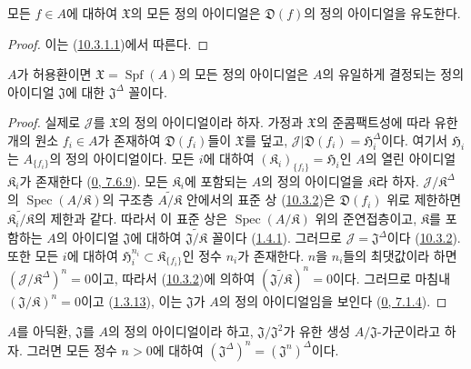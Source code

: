\begin{proposition}[10.3.4]
\label{I.10.3.4-ko}
모든 $f\in A$에 대하여 $\mathfrak{X}$의 모든 정의 아이디얼은
$\mathfrak{D}(f)$의 정의 아이디얼을 유도한다.
\end{proposition}

\begin{proof}
이는 (\hyperref[I.10.3.1.1-ko]{10.3.1.1})에서 따른다.
\end{proof}

\begin{proposition}[10.3.5]
\label{I.10.3.5-ko}
$A$가 허용환이면 $\mathfrak{X}=\operatorname{Spf}(A)$의 모든 정의
아이디얼은 $A$의 유일하게 결정되는 정의 아이디얼 $\mathfrak{J}$에 대한
$\mathfrak{J}^\Delta$ 꼴이다.
\end{proposition}

\begin{proof}
실제로 $\mathscr{J}$를 $\mathfrak{X}$의 정의 아이디얼이라 하자.
가정과 $\mathfrak{X}$의 준콤팩트성에 따라 유한 개의 원소
$f_i\in A$가 존재하여 $\mathfrak{D}(f_i)$들이 $\mathfrak{X}$를 덮고,
$\mathscr{J}|\mathfrak{D}(f_i)=\mathfrak{H}_i^\Delta$이다. 여기서
$\mathfrak{H}_i$는 $A_{\{f_i\}}$의 정의 아이디얼이다. 모든 $i$에
대하여 $(\mathfrak{K}_i)_{\{f_i\}}=\mathfrak{H}_i$인 $A$의 열린
아이디얼 $\mathfrak{K}_i$가 존재한다
(\hyperref[0.7.6.9-ko]{0, 7.6.9}). 모든 $\mathfrak{K}_i$에 포함되는
$A$의 정의 아이디얼을 $\mathfrak{K}$라 하자.
$\mathscr{J}/\mathfrak{K}^\Delta$의
$\operatorname{Spec}(A/\mathfrak{K})$의 구조층
$\widetilde{A/\mathfrak{K}}$ 안에서의 표준 상
(\hyperref[I.10.3.2-ko]{10.3.2})은 $\mathfrak{D}(f_i)$ 위로 제한하면
$\widetilde{\mathfrak{K}_i/\mathfrak{K}}$의 제한과 같다. 따라서 이
표준 상은 $\operatorname{Spec}(A/\mathfrak{K})$ 위의 준연접층이고,
$\mathfrak{K}$를 포함하는 $A$의 아이디얼 $\mathfrak{J}$에 대하여
$\widetilde{\mathfrak{J}/\mathfrak{K}}$ 꼴이다
(\hyperref[I.1.4.1-ko]{1.4.1}). 그러므로
$\mathscr{J}=\mathfrak{J}^\Delta$이다
(\hyperref[I.10.3.2-ko]{10.3.2}). 또한 모든 $i$에 대하여
$\mathfrak{H}_i^{n_i}\subset\mathfrak{K}_{\{f_i\}}$인 정수 $n_i$가
존재한다. $n$을 $n_i$들의 최댓값이라 하면
$(\mathscr{J}/\mathfrak{K}^\Delta)^n=0$이고, 따라서
(\hyperref[I.10.3.2-ko]{10.3.2})에 의하여
$(\widetilde{\mathfrak{J}/\mathfrak{K}})^n=0$이다. 그러므로 마침내
$(\mathfrak{J}/\mathfrak{K})^n=0$이고
(\hyperref[I.1.3.13-ko]{1.3.13}), 이는 $\mathfrak{J}$가 $A$의 정의
아이디얼임을 보인다 (\hyperref[0.7.1.4-ko]{0, 7.1.4}).
\end{proof}

\begin{proposition}[10.3.6]
\label{I.10.3.6-ko}
$A$를 아딕환, $\mathfrak{J}$를 $A$의 정의 아이디얼이라 하고,
$\mathfrak{J}/\mathfrak{J}^2$가 유한 생성
$A/\mathfrak{J}$-가군이라고 하자. 그러면 모든 정수 $n>0$에 대하여
$(\mathfrak{J}^\Delta)^n=(\mathfrak{J}^n)^\Delta$이다.
\end{proposition}

